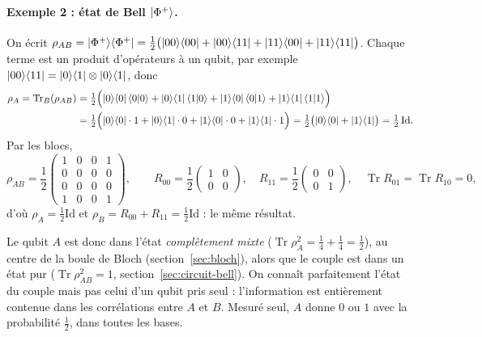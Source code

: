 \paragraph{Exemple 2 : état de Bell $|\Phi^+\rangle$.} On écrit
$\rho_{AB}=|\Phi^+\rangle\langle \Phi^+|=\frac12\big(|00\rangle\langle 00|+|00\rangle\langle 11|+|11\rangle\langle 00|
+|11\rangle\langle 11|\big)$. Chaque terme est un produit d'opérateurs à un qubit, par exemple
$|00\rangle\langle 11|=|0\rangle\langle 1|\otimes|0\rangle\langle 1|$, donc
\begin{align*}
  \rho_A=\operatorname{Tr}_B(\rho_{AB})
  &=\tfrac12\Big(|0\rangle\langle 0|\,\langle 0|0\rangle+|0\rangle\langle 1|\,\langle 1|0\rangle
      +|1\rangle\langle 0|\,\langle 0|1\rangle+|1\rangle\langle 1|\,\langle 1|1\rangle\Big)\\
  &=\tfrac12\Big(|0\rangle\langle 0|\cdot1+|0\rangle\langle 1|\cdot0+|1\rangle\langle 0|\cdot0+|1\rangle\langle 1|\cdot1\Big)
   =\tfrac12\big(|0\rangle\langle 0|+|1\rangle\langle 1|\big)=\tfrac12\,\mathrm{Id}.
\end{align*}
Par les blocs,
\[
  \rho_{AB}=\frac12\begin{pmatrix}1&0&0&1\\0&0&0&0\\0&0&0&0\\1&0&0&1\end{pmatrix},
  \qquad
  R_{00}=\frac12\begin{pmatrix}1&0\\0&0\end{pmatrix},\quad
  R_{11}=\frac12\begin{pmatrix}0&0\\0&1\end{pmatrix},\quad
  \operatorname{Tr}R_{01}=\operatorname{Tr}R_{10}=0,
\]
d'où $\rho_A=\frac12\mathrm{Id}$ et $\rho_B=R_{00}+R_{11}=\frac12\mathrm{Id}$ : le même résultat.

Le qubit $A$ est donc dans l'état \emph{complètement mixte} ($\operatorname{Tr}\rho_A^2=\frac14+\frac14=\frac12$),
au centre de la boule de Bloch (section~\ref{sec:bloch}), alors que le couple est dans un état pur
($\operatorname{Tr}\rho_{AB}^2=1$, section~\ref{sec:circuit-bell}). On connaît parfaitement l'état du
couple mais pas celui d'un qubit pris seul : l'information est entièrement contenue dans les
corrélations entre $A$ et $B$. Mesuré seul, $A$ donne $0$ ou $1$ avec la probabilité $\frac12$, dans
toutes les bases.

